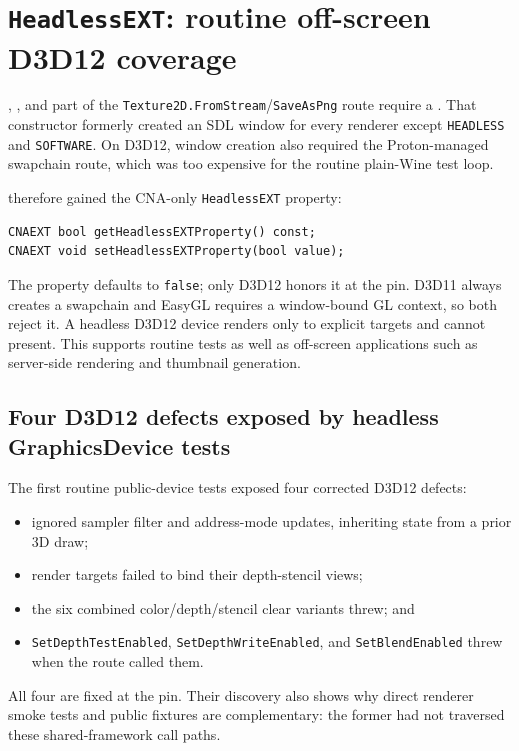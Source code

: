 \section{\texttt{HeadlessEXT}: routine off-screen D3D12 coverage}

, , and part of the
\texttt{Texture2D.FromStream}/\texttt{SaveAsPng} route require a .
That constructor formerly created an SDL window for every renderer except \texttt{HEADLESS} and
\texttt{SOFTWARE}. On D3D12, window creation also required the Proton-managed swapchain route,
which was too expensive for the routine plain-Wine test loop.

 therefore gained the CNA-only \texttt{HeadlessEXT} property:

\begin{lstlisting}
CNAEXT bool getHeadlessEXTProperty() const;
CNAEXT void setHeadlessEXTProperty(bool value);
\end{lstlisting}

The property defaults to \texttt{false}; only D3D12 honors it at the pin. D3D11 always creates a
swapchain and EasyGL requires a window-bound GL context, so both reject it. A headless D3D12
device renders only to explicit targets and cannot present. This supports routine tests as well
as off-screen applications such as server-side rendering and thumbnail generation.

\subsection{Four D3D12 defects exposed by headless GraphicsDevice tests}

The first routine public-device tests exposed four corrected D3D12 defects:

\begin{itemize}
  \item {} ignored sampler filter and address-mode updates, inheriting state
        from a prior 3D draw;
  \item render targets failed to bind their depth-stencil views;
  \item the six combined color/depth/stencil clear variants threw; and
  \item \texttt{SetDepthTestEnabled}, \texttt{SetDepthWriteEnabled}, and
        \texttt{SetBlendEnabled} threw when the  route called them.
\end{itemize}

All four are fixed at the pin. Their discovery also shows why direct renderer smoke tests and
public  fixtures are complementary: the former had not traversed these
shared-framework call paths.
